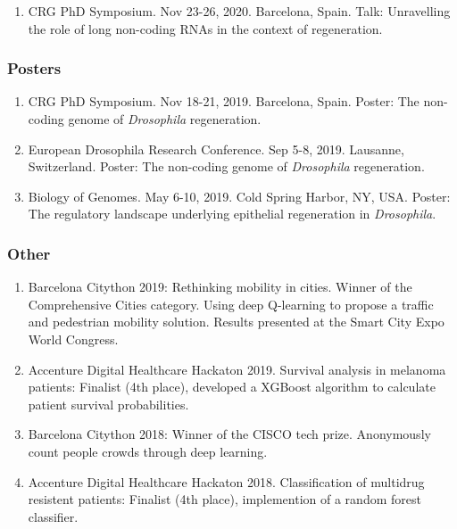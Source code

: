 \begin{enumerate}
\item CRG PhD Symposium. Nov 23-26, 2020. Barcelona, Spain. Talk: Unravelling the role of long non-coding RNAs in the context of regeneration. 
\end{enumerate}

\subsubsection{Posters}
\label{sec:posters}

\begin{enumerate}
\item CRG PhD Symposium. Nov 18-21, 2019. Barcelona, Spain. Poster: The non-coding genome of \textit{Drosophila} regeneration.
\item European Drosophila Research Conference. Sep 5-8, 2019. Lausanne, Switzerland. Poster: The non-coding genome of \textit{Drosophila} regeneration.
\item Biology of Genomes. May 6-10, 2019. Cold Spring Harbor, NY, USA. Poster: The regulatory landscape underlying epithelial regeneration in \textit{Drosophila}. 
\end{enumerate}    

\subsubsection{Other}
\label{sec:other}

\begin{enumerate}
\item Barcelona Citython 2019: Rethinking mobility in cities. Winner of the Comprehensive Cities category. Using deep Q-learning to propose a traffic and pedestrian mobility solution. Results presented at the Smart City Expo World Congress. 
\item Accenture Digital Healthcare Hackaton 2019. Survival analysis in melanoma patients: Finalist (4th place), developed a XGBoost algorithm to calculate patient survival probabilities. 
\item Barcelona Citython 2018: Winner of the CISCO tech prize. Anonymously count people crowds through deep learning. 
\item Accenture Digital Healthcare Hackaton 2018. Classification of multidrug resistent patients: Finalist (4th place), implemention of a random forest classifier.
\end{enumerate}    

\clearpage

